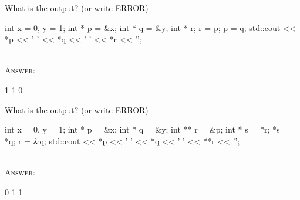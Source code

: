 \nextq
What is the output? (or write ERROR)
\begin{console}[fontsize=\small]
int x = 0, y = 1;
int * p = &x;
int * q = &y;
int * r;
r = p;
p = q;
std::cout << *p << ' ' << *q << ' ' << *r << '\n';
\end{console}
\\ \textsc{Answer:}\vspace{-2mm}
\begin{answercode}
1 1 0
\end{answercode}

\nextq
What is the output? (or write ERROR)
\begin{console}[fontsize=\small]
int x = 0, y = 1;
int * p = &x;
int * q = &y;
int ** r = &p;
int * s = *r;
*s = *q;
r = &q;
std::cout << *p << ' ' << *q << ' ' << **r << '\n';
\end{console}
\\ \textsc{Answer:}\vspace{-2mm}
\begin{answercode}
0 1 1
\end{answercode}


\newpage


